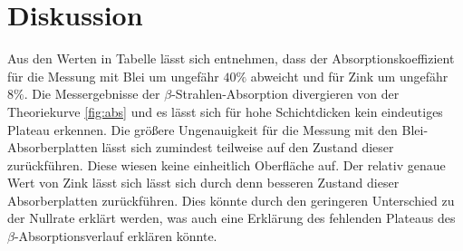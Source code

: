 \section{Diskussion}
\label{sec:Diskussion}
Aus den Werten in Tabelle lässt sich entnehmen, dass der Absorptionskoeffizient für die Messung mit Blei um ungefähr $40\%$ abweicht und für Zink um ungefähr $8\%$.
Die Messergebnisse der $\beta$-Strahlen-Absorption divergieren von der Theoriekurve \ref{fig:abs} und es lässt sich für hohe Schichtdicken kein eindeutiges Plateau erkennen.
Die größere Ungenauigkeit für die Messung mit den Blei-Absorberplatten lässt sich zumindest teilweise auf den Zustand dieser zurückführen.
Diese wiesen keine einheitlich Oberfläche auf.
Der relativ genaue Wert von Zink lässt sich lässt sich durch denn besseren Zustand dieser Absorberplatten zurückführen.
Dies könnte durch den geringeren Unterschied zu der Nullrate erklärt werden, was auch eine Erklärung des fehlenden Plateaus des $\beta$-Absorptionsverlauf erklären könnte.
